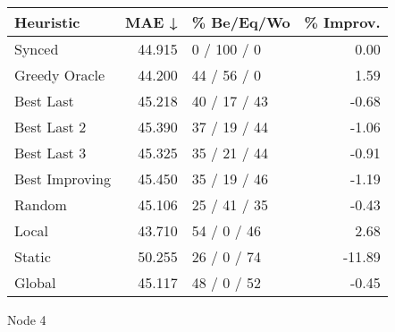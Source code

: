 \begin{tabular}{lrlr}
\toprule
\textbf{Heuristic} & \textbf{MAE ↓} & \textbf{\% Be/Eq/Wo} & \textbf{\% Improv.} \\
\midrule
            Synced &         44.915 &          0 / 100 / 0 &                0.00 \\
     Greedy Oracle &         44.200 &          44 / 56 / 0 &                1.59 \\
         Best Last &         45.218 &         40 / 17 / 43 &               -0.68 \\
       Best Last 2 &         45.390 &         37 / 19 / 44 &               -1.06 \\
       Best Last 3 &         45.325 &         35 / 21 / 44 &               -0.91 \\
    Best Improving &         45.450 &         35 / 19 / 46 &               -1.19 \\
            Random &         45.106 &         25 / 41 / 35 &               -0.43 \\
             Local &         43.710 &          54 / 0 / 46 &                2.68 \\
            Static &         50.255 &          26 / 0 / 74 &              -11.89 \\
            Global &         45.117 &          48 / 0 / 52 &               -0.45 \\
\bottomrule
\end{tabular}
\caption{Node 4}
\label{tab:non_lr05_le1_bs4_4}
